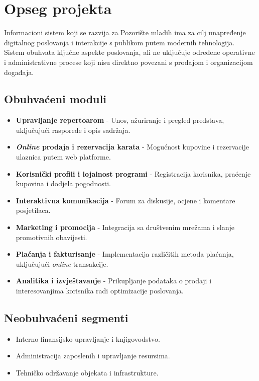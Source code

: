 \section{Opseg projekta}

Informacioni sistem koji se razvija za Pozorište mladih ima za cilj unapređenje digitalnog poslovanja i interakcije s publikom putem modernih tehnologija. Sistem obuhvata ključne aspekte poslovanja, ali ne uključuje određene operativne i administrativne procese koji nisu direktno povezani s prodajom i organizacijom događaja.

\subsection{Obuhvaćeni moduli}

\begin{itemize}
\item \textbf{Upravljanje repertoarom} - Unos, ažuriranje i pregled predstava, uključujući rasporede i opis sadržaja.
\item \textbf{\textit{Online} prodaja i rezervacija karata} - Mogućnost kupovine i rezervacije ulaznica putem web platforme.
\item \textbf{Korisnički profili i lojalnost programi} - Registracija korisnika, praćenje kupovina i dodjela pogodnosti.
\item \textbf{Interaktivna komunikacija} - Forum za diskusije, ocjene i komentare posjetilaca.
\item \textbf{Marketing i promocija} - Integracija sa društvenim mrežama i slanje promotivnih obavijesti.
\item \textbf{Plaćanja i fakturisanje} - Implementacija različitih metoda plaćanja, uključujući \textit{online} transakcije.
\item \textbf{Analitika i izvještavanje} - Prikupljanje podataka o prodaji i interesovanjima korisnika radi optimizacije poslovanja.
\end{itemize}

\subsection{Neobuhvaćeni segmenti}

\begin{itemize}
\item Interno finansijsko upravljanje i knjigovodstvo.
\item Administracija zaposlenih i upravljanje resursima.
\item Tehničko održavanje objekata i infrastrukture.
\end{itemize}

